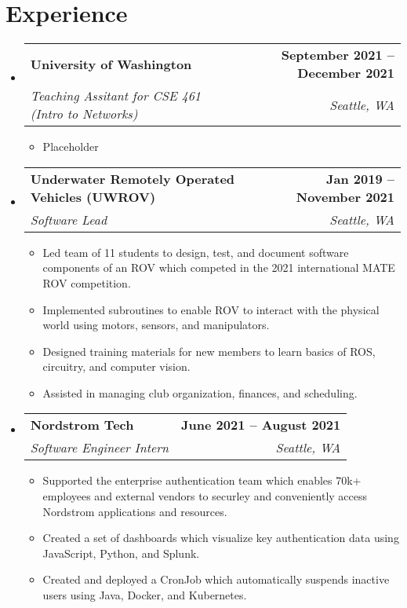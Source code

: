 \documentclass[letterpaper,11pt]{article}
\makeatletter
\newcommand{\resumeItem}[1]{
  \item\small{
    {#1 \vspace{-2pt}}
  }
}
\newcommand{\resumeSubheading}[4]{
  \vspace{-2pt}\item
    \begin{tabular*}{1.0\textwidth}[t]{l@{\extracolsep{\fill}}r}
      \textbf{#1} & \textbf{\small #2} \\
      \textit{\small#3} & \textit{\small #4} \\
    \end{tabular*}\vspace{-7pt}
}
\newcommand{\resumeSubHeadingListStart}{\begin{itemize}[leftmargin=0.0in, label={}]}
\newcommand{\resumeSubHeadingListEnd}{\end{itemize}}
\newcommand{\resumeItemListStart}{\begin{itemize}}
\newcommand{\resumeItemListEnd}{\end{itemize}\vspace{-5pt}}
\makeatother
\begin{document}
\section{Experience}
  \resumeSubHeadingListStart
    \resumeSubheading
    {University of Washington}{September 2021 -- December 2021}
    {Teaching Assitant for CSE 461 (Intro to Networks)}{Seattle, WA}
    \resumeItemListStart
        \resumeItem{Placeholder}
    \resumeItemListEnd

    \resumeSubheading
    {Underwater Remotely Operated Vehicles (UWROV)}{Jan 2019 -- November 2021}
    {Software Lead}{Seattle, WA}
    \resumeItemListStart
      \resumeItem{Led team of 11 students to design, test, and document software components
                  of an ROV which competed in the 2021 international MATE ROV competition.}
      \resumeItem{Implemented subroutines to enable ROV to interact with the physical
                  world using motors, sensors, and manipulators.}
      \resumeItem{Designed training materials for new members to learn basics of ROS,
                  circuitry, and computer vision.}
      \resumeItem{Assisted in managing club organization, finances, and scheduling.}
    \resumeItemListEnd

    \resumeSubheading
      {Nordstrom Tech}{June 2021 -- August 2021}
      {Software Engineer Intern}{Seattle, WA}
      \resumeItemListStart
        \resumeItem{Supported the enterprise authentication team which enables 70k+ employees
                    and external vendors to securley and conveniently access Nordstrom applications and resources.}
        \resumeItem{Created a set of dashboards which visualize key authentication data using JavaScript, Python, and Splunk.}
        \resumeItem{Created and deployed a CronJob which automatically suspends inactive users using Java, Docker, and Kubernetes.}
      \resumeItemListEnd
  \resumeSubHeadingListEnd
\vspace{-16pt}

\end{document}
